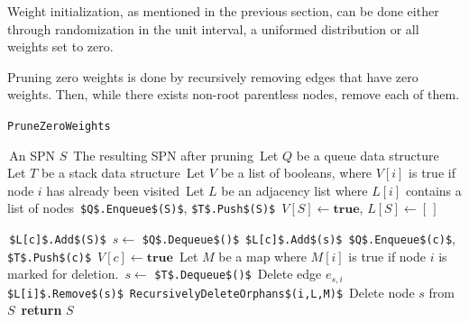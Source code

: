 \documentclass{amsart}
\theoremstyle{plain}
\numberwithin{equation}{section}
\newcommand{\code}[1]{\lstinline[mathescape=true]{#1}}
\newcommand{\mcode}[1]{\lstinline[mathescape]!#1!}
\begin{document}
Weight initialization, as mentioned in the previous section, can be done either through
randomization in the unit interval, a uniformed distribution or all weights set to zero.

Pruning zero weights is done by recursively removing edges that have zero weights. Then, while
there exists non-root parentless nodes, remove each of them.

\begin{algorithm}[h]
  \caption{\code{PruneZeroWeights}}\label{alg:prunezeroweights}
  \begin{algorithmic}[1]
    \Require\,An SPN $S$
    \Ensure\,The resulting SPN after pruning
    \State\,Let $Q$ be a queue data structure
    \State\,Let $T$ be a stack data structure
    \State\,Let $V$ be a list of booleans, where $V[i]$ is true if node $i$ has already been
      visited
    \State\,Let $L$ be an adjacency list where $L[i]$ contains a list of nodes
    \State\,\mcode{$Q$.Enqueue$(S)$}, \mcode{$T$.Push$(S)$}
    \State\,$V[S]\gets\textbf{true}$, $L[S]\gets[\,]$
  \end{algorithmic}
\end{algorithm}
\begin{algorithm}[h]
  \begin{algorithmic}[1]
      \State\,\mcode{$L[c]$.Add$(S)$}
    \EndFor%
    \While{\textbf{not} \mcode{$Q$.Empty$()$}}
      \State\,$s\gets$ \mcode{$Q$.Dequeue$()$}
        \State\,\mcode{$L[c]$.Add$(s)$}
          \State\,\mcode{$Q$.Enqueue$(c)$}, \mcode{$T$.Push$(c)$}
          \State\,$V[c]\gets\textbf{true}$
        \EndIf%
      \EndFor%
    \EndWhile%
    \State\,Let $M$ be a map where $M[i]$ is true if node $i$ is marked for deletion.
    \While{\textbf{not} \mcode{$T$.Empty$()$}}
      \State\,$s\gets$ \mcode{$T$.Dequeue$()$}
            \State\,Delete edge $e_{s,i}$
            \State\,\mcode{$L[i]$.Remove$(s)$}
            \State\,\mcode{RecursivelyDeleteOrphans$(i,L,M)$}
          \EndIf%
        \EndFor%
      \EndIf%
    \EndWhile%
        \State\,Delete node $s$ from $S$
      \EndIf%
    \EndFor%
    \State\,\textbf{return} $S$
  \end{algorithmic}
\end{algorithm}
\end{document}
